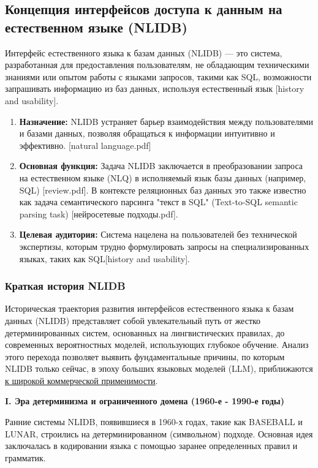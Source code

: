 \subsection{Концепция интерфейсов доступа к данным на естественном языке (NLIDB)}

Интерфейс естественного языка к базам данных (NLIDB) — это система, разработанная для предоставления пользователям, не обладающим техническими знаниями или опытом работы с языками запросов, такими как SQL, возможности запрашивать информацию из баз данных, используя естественный язык [history and usability].

\begin{enumerate}
    \item \textbf{Назначение:} NLIDB устраняет барьер взаимодействия между пользователями и базами данных, позволяя обращаться к информации интуитивно и эффективно. [natural language.pdf]
    \item \textbf{Основная функция:} Задача NLIDB заключается в преобразовании запроса на естественном языке (NLQ) в исполняемый язык базы данных (например, SQL) [review.pdf]. В контексте реляционных баз данных это также известно как задача семантического парсинга "текст в SQL" (Text-to-SQL semantic parsing task) [нейросетевые подходы.pdf].
    \item \textbf{Целевая аудитория:} Система нацелена на пользователей без технической экспертизы, которым трудно формулировать запросы на специализированных языках, таких как SQL[history and usability].
\end{enumerate}

\subsubsection{Краткая история NLIDB}

Историческая траектория развития интерфейсов естественного языка к базам данных (NLIDB) представляет собой увлекательный путь от жестко детерминированных систем, основанных на лингвистических правилах, до современных вероятностных моделей, использующих глубокое обучение. Анализ этого перехода позволяет выявить фундаментальные причины, по которым NLIDB только сейчас, в эпоху больших языковых моделей (LLM), приближаются \underline{к широкой коммерческой применимости}.

\textbf{I. Эра детерминизма и ограниченного домена (1960-е - 1990-е годы)}

Ранние системы NLIDB, появившиеся в 1960-х годах, такие как BASEBALL и LUNAR, строились на детерминированном (символьном) подходе. Основная идея заключалась в кодировании языка с помощью заранее определенных правил и грамматик.

